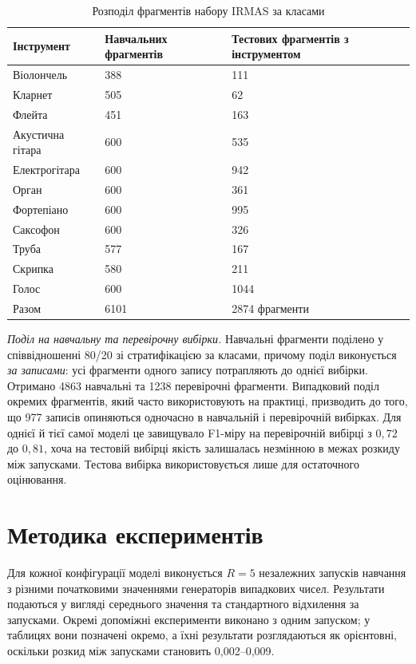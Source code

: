 \begin{table}[H]
\centering
\caption{Розподіл фрагментів набору IRMAS за класами}
\label{tab:data}
\begin{tabular}{|p{5cm}|p{4.2cm}|p{5.2cm}|}
\hline
Інструмент & Навчальних фрагментів & Тестових фрагментів з інструментом \\
\hline
Віолончель        & 388 & 111 \\
Кларнет           & 505 &  62 \\
Флейта            & 451 & 163 \\
Акустична гітара  & 600 & 535 \\
Електрогітара     & 600 & 942 \\
Орган             & 600 & 361 \\
Фортепіано        & 600 & 995 \\
Саксофон          & 600 & 326 \\
Труба             & 577 & 167 \\
Скрипка           & 580 & 211 \\
Голос             & 600 & 1044 \\
\hline
Разом    & 6101 & 2874 фрагменти \\
\hline
\end{tabular}
\end{table}

\textit{Поділ на навчальну та перевірочну вибірки.} Навчальні фрагменти
поділено у співвідношенні 80/20 зі стратифікацією за класами, причому
поділ виконується \textit{за записами}: усі фрагменти одного запису
потрапляють до однієї вибірки. Отримано 4863 навчальні та 1238
перевірочні фрагменти. Випадковий поділ окремих фрагментів, який часто
використовують на практиці, призводить до того, що 977 записів
опиняються одночасно в навчальній і перевірочній вибірках. Для однієї й
тієї самої моделі це завищувало F1-міру на перевірочній вибірці з $0{,}72$
до $0{,}81$, хоча на тестовій вибірці якість залишалась незмінною в межах
розкиду між запусками. Тестова вибірка використовується лише для
остаточного оцінювання.

\section{Методика експериментів}
\label{sec:protocol}

Для кожної конфігурації моделі виконується $R = 5$ незалежних запусків
навчання з різними початковими значеннями генераторів випадкових чисел.
Результати подаються у вигляді середнього значення та стандартного
відхилення за запусками. Окремі допоміжні експерименти виконано з одним
запуском; у таблицях вони позначені окремо, а їхні результати
розглядаються як орієнтовні, оскільки розкид між запусками становить
0,002--0,009.

